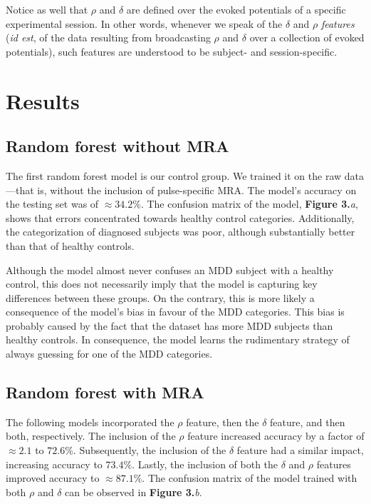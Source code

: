 \documentclass{article}
\begin{document}
\begin{multicols}{2}
Notice as well that $\rho$ and $\delta$ are defined over the evoked potentials
of a specific experimental session. In other words, whenever we speak of the
$\delta$ and $\rho$ \textit{features} (\textit{id est}, of the data resulting
from broadcasting $\rho$ and $\delta$ over a collection of evoked potentials),
such features are understood to be subject- and session-specific.


\section{Results}

\subsection{Random forest without MRA}

The first random forest model is our control group. We trained it on the raw
data ---that is, without the inclusion of pulse-specific MRA. The model's
accuracy on the testing set was of $\approx34.2 \%$. The confusion matrix of the
model, \textbf{Figure 3.}\textit{a}, shows that errors concentrated towards
healthy control categories. Additionally, the categorization of diagnosed
subjects was poor, although substantially better than that of healthy controls. 

Although the model almost never confuses an MDD subject with a healthy control,
this does not necessarily imply that the model is capturing key differences
between these groups. On the contrary, this is more likely a consequence of the
model's bias in favour of the MDD categories. This bias is probably caused by
the fact that the dataset has more MDD subjects than healthy controls. In
consequence, the model learns the rudimentary strategy of always guessing for
one of the MDD categories.

\subsection{Random forest with MRA}

The following models incorporated the $\rho$ feature, then the $\delta$ feature,
and then both, respectively. The inclusion of the $\rho$ feature increased
accuracy by a factor of $\approx 2.1$ to $72.6\%$. Subsequently, the inclusion
of the $\delta$ feature had a similar impact, increasing accuracy to $73.4\%$.
Lastly, the inclusion of both the $\delta$ and $\rho$ features improved accuracy
to $\approx 87.1\%$. The confusion matrix of the model trained with both $\rho$
and $\delta$ can be observed in \textbf{Figure 3.}\textit{b}.


\end{multicols}
\end{document}
